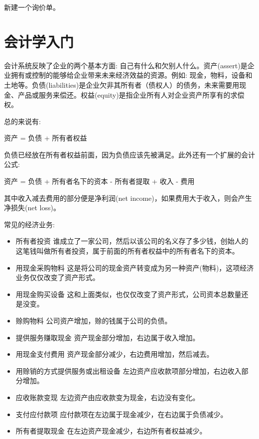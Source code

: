 \documentclass[11pt,a4paper]{sphinxmanual}
\begin{document}
新建一个询价单。






\section{会计学入门}
\label{sec-13-11}
会计系统反映了企业的两个基本方面: 自己有什么和欠别人什么。资产(assert)是企业拥有或控制的能够给企业带来未来经济效益的资源。例如: 现金，物料，设备和土地等。负债(liabilities)是企业欠非其所有者（债权人）的债务，未来需要用现金、产品或服务来偿还。权益(equity)是指企业所有人对企业资产所享有的求偿权。

总的来说有:
\begin{framed}
资产 = 负债 + 所有者权益
\end{framed}

负债已经放在所有者权益前面，因为负债应该先被满足。此外还有一个扩展的会计公式:

\begin{framed}
资产 = 负债 + 所有者名下的资本 - 所有者提取 + 收入 - 费用
\end{framed}

其中收入减去费用的部分便是净利润(net income)，如果费用大于收入，则会产生净损失(net loss)。

常见的经济业务:
\begin{itemize}
\item 所有者投资 谁成立了一家公司，然后以该公司的名义存了多少钱，创始人的这笔钱叫做所有者投资，属于前面的所有者权益中的所有者名下的资本。
\item 用现金采购物料 这是将公司的现金资产转变成为另一种资产(物料)，这项经济业务仅仅改变了资产形式。
\item 用现金购买设备 这和上面类似，也仅仅改变了资产形式，公司资本总数量还是没变。
\item 赊购物料 公司资产增加，赊的钱属于公司的负债。
\item 提供服务赚取现金 资产现金部分增加，右边属于收入增加。
\item 用现金支付费用 资产现金部分减少，右边费用增加，然后减去。
\item 用赊销的方式提供服务或出租设备 左边资产应收款项部分增加，右边收入部分增加。
\item 应收账款变现 左边资产由应收款变为现金，右边没有变化。
\item 支付应付款项 应付款项在左边属于现金减少，在右边属于负债减少。
\item 所有者提取现金 在左边资产现金减少，右边所有者权益减少。
\end{itemize}
\end{document}
